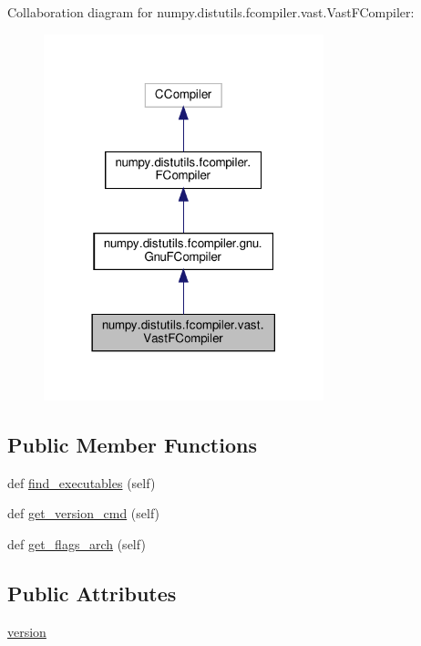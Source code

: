Collaboration diagram for numpy.\+distutils.\+fcompiler.\+vast.\+Vast\+F\+Compiler\+:
\nopagebreak
\begin{figure}[H]
\begin{center}
\leavevmode
\includegraphics[width=230pt]{classnumpy_1_1distutils_1_1fcompiler_1_1vast_1_1VastFCompiler__coll__graph}
\end{center}
\end{figure}
\subsection*{Public Member Functions}
\begin{DoxyCompactItemize}
\item 
def \hyperlink{classnumpy_1_1distutils_1_1fcompiler_1_1vast_1_1VastFCompiler_a804d1f16bc07aa383f37f075ef9e8fe3}{find\+\_\+executables} (self)
\item 
def \hyperlink{classnumpy_1_1distutils_1_1fcompiler_1_1vast_1_1VastFCompiler_a3d63cd699c781ad9224ae7cf1519af33}{get\+\_\+version\+\_\+cmd} (self)
\item 
def \hyperlink{classnumpy_1_1distutils_1_1fcompiler_1_1vast_1_1VastFCompiler_a4842ed02a77853521c5cbbd32d2c5424}{get\+\_\+flags\+\_\+arch} (self)
\end{DoxyCompactItemize}
\subsection*{Public Attributes}
\begin{DoxyCompactItemize}
\item 
\hyperlink{classnumpy_1_1distutils_1_1fcompiler_1_1vast_1_1VastFCompiler_abb88bfed8b663eeb8a5b76e004274e24}{version}
\end{DoxyCompactItemize}
